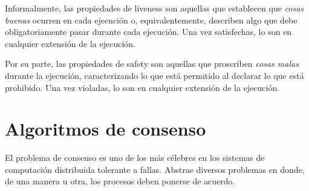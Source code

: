 Informalmente, las propiedades de liveness son aquellas que establecen que \emph{cosas buenas} ocurren
en cada ejecución o, equivalentemente, describen algo que debe obligatoriamente pasar durante cada ejecución.
Una vez satisfechas, lo son en cualquier extensión de la ejecución.

Por su parte, las propiedades de safety son aquellas que proscriben \emph{cosas malas} durante
la ejecución, caracterizando lo que está permitido al declarar lo que está
prohibido. Una vez violadas, lo son en cualquier extensión de la ejecución.


\section{Algoritmos de consenso}\label{subsubsec:consensus}
El problema de consenso es uno de los más célebres en los sistemas de computación distribuida tolerante a fallas.
%
Abstrae diversos problemas en donde, de una manera u otra, los procesos deben ponerse de acuerdo.
%

